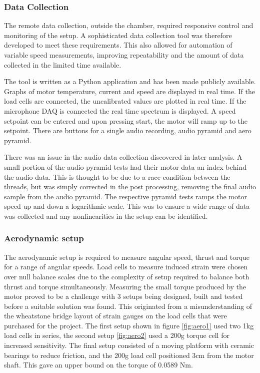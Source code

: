 \documentclass[12pt,a4paper]{article}
\begin{document}
\subsubsection{Data Collection}

The remote data collection, outside the chamber, required responsive control and monitoring of the setup.
A sophisticated data collection tool was therefore developed to meet these requirements.
This also allowed for automation of variable speed measurements, improving repeatability and the amount of data collected in the limited time available.

The tool is written as a Python application and has been made publicly available.
Graphs of motor temperature, current and speed are displayed in real time.
If the load cells are connected, the uncalibrated values are plotted in real time.
If the microphone DAQ is connected the real time spectrum is displayed.
A speed setpoint can be entered and upon pressing start, the motor will ramp up to the setpoint.
There are buttons for a single audio recording, audio pyramid and aero pyramid.

There was an issue in the audio data collection discovered in later analysis.
A small portion of the audio pyramid tests had their motor data an index behind the audio data.
This is thought to be due to a race condition between the threads, but was simply corrected in the post processing,
removing the final audio sample from the audio pyramid.
The respective pyramid tests ramps the motor speed up and down a logarithmic scale.
This was to ensure a wide range of data was collected and any nonlinearities in the setup can be identified.

\subsubsection{Aerodynamic setup}
The aerodynamic setup is required to measure angular speed, thrust and torque for a range of angular speeds.
Load cells to measure induced strain were chosen over null balance scales due to the complexity of setup required to balance both thrust and torque simultaneously.
Measuring the small torque produced by the motor proved to be a challenge with 3 setups being designed, built and tested before a suitable solution was found.
This originated from a misunderstanding of the wheatstone bridge layout of strain gauges on the load cells that were purchased for the project.
The first setup shown in figure \ref{fig:aero1} used two 1kg load cells in series, the second setup \ref{fig:aero2} used a 200g torque cell for increased sensitivity.
The final setup consisted of a moving platform with ceramic bearings to reduce friction, and the 200g load cell positioned 3cm from the motor shaft.
This gave an upper bound on the torque of 0.0589 Nm.
\end{document}
